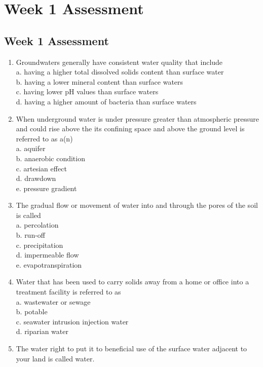 
\chapter{Week 1 Assessment}
\section*{Week 1 Assessment}
\begin{enumerate}[1.]
\item Groundwaters generally have consistent water quality that include\\
a. having a higher total dissolved solids content than surface water\\
b. having a lower mineral content than surface waters\\
c. having lower $\mathrm{pH}$ values than surface waters\\
d. having a higher amount of bacteria than surface waters\\
\item When underground water is under pressure greater than atmospheric pressure and could rise above the its confining space and above the ground level is referred to as a(n)\\
a. aquifer\\
b. anaerobic condition\\
c. artesian effect\\
d. drawdown\\
e. pressure gradient\\
\item The gradual flow or movement of water into and through the pores of the soil is called\\
a. percolation\\
b. run-off\\
c. precipitation\\
d. impermeable flow\\
e. evapotranspiration\\
\item Water that has been used to carry solids away from a home or office into a treatment facility is referred to as\\
a. wastewater or sewage\\
b. potable\\
c. seawater intrusion injection water\\
d. riparian water\\
\item The water right to put it to beneficial use of the surface water adjacent to your land is called water.\\

\end{enumerate}
